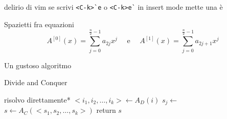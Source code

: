 delirio di vim se scrivi \verb|<C-k>`e| o \verb|<C-k>e`| in insert mode mette una è


Spazietti fra equazioni
\begin{equation*}
    A^{[0]}(x) = \sum_{j=0}^{\frac{n}{2}-1} a_{2j}x^j
    \quad \text{ e } \quad
    A^{[1]}(x) = \sum_{j=0}^{\frac{n}{2}-1} a_{2j+1}x^j
\end{equation*}

Un gustoso algoritmo
\begin{algorithm}[H]
\caption{Divide and Conquer}\label{alg:dncmock}
\begin{algorithmic}[1]
                                     
            \State *risolvo direttamente*
        \EndIf
        \State $<i_1, i_2, \dots, i_k> \gets A_D(i)$    
                            
            \State $s_j \gets $ 
        \EndFor
        \State $s \gets A_C(<s_1, s_2, \dots, s_k>)$    
        \State return $s$
    \EndProcedure
\end{algorithmic}
\end{algorithm}



